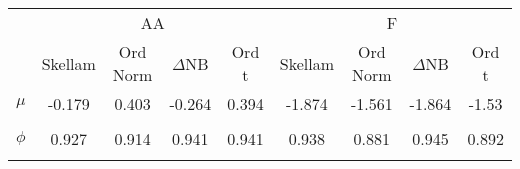 \begin{footnotesize}
\tabcolsep=0.07cm
\begin{singlespace}
\begin{tabular}{ccccccccc} \toprule 
 & \multicolumn{4}{c}{AA}& \multicolumn{4}{c}{F} \\ 
\cmidrule(r){2-5} \cmidrule(r){6-9} &  \multicolumn{1}{c}{Skellam}&  \multicolumn{1}{c}{Ord Norm}&  \multicolumn{1}{c}{$\Delta$NB}&  \multicolumn{1}{c}{Ord t}&  \multicolumn{1}{c}{Skellam}&  \multicolumn{1}{c}{Ord Norm}&  \multicolumn{1}{c}{$\Delta$NB}&  \multicolumn{1}{c}{Ord t} \\ \midrule 
 $ \mu $ & -0.179 & 0.403 & -0.264 & 0.394 & -1.874 & -1.561 & -1.864 & -1.53 \\ 
 & \begin{tiny} [-0.238,-0.12] \end{tiny}  & \begin{tiny} [0.339,0.466] \end{tiny}  & \begin{tiny} [-0.323,-0.204] \end{tiny}  & \begin{tiny} [0.321,0.467] \end{tiny}  & \begin{tiny} [-1.944,-1.803] \end{tiny}  & \begin{tiny} [-1.619,-1.501] \end{tiny}  & \begin{tiny} [-1.935,-1.792] \end{tiny}  & \begin{tiny} [-1.587,-1.473] \end{tiny}  \\ 
$ \phi $ & 0.927 & 0.914 & 0.941 & 0.941 & 0.938 & 0.881 & 0.945 & 0.892 \\ 
 & \begin{tiny} [0.921,0.934] \end{tiny}  & \begin{tiny} [0.906,0.922] \end{tiny}  & \begin{tiny} [0.933,0.947] \end{tiny}  & \begin{tiny} [0.933,0.951] \end{tiny}  & \begin{tiny} [0.929,0.949] \end{tiny}  & \begin{tiny} [0.869,0.895] \end{tiny}  & \begin{tiny} [0.936,0.954] \end{tiny}  & \begin{tiny} [0.88,0.905] \end{tiny}  \\ 

\end{tabular}
\end{singlespace}
\end{footnotesize}
